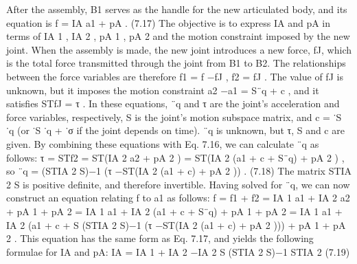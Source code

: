 After the assembly, B1 serves as the handle for the new articulated body, and its equation is f = IA a1 + pA . (7.17) The objective is to express IA and pA in terms of IA 1 , IA 2 , pA 1 , pA 2 and the motion constraint imposed by the new joint. When the assembly is made, the new joint introduces a new force, fJ, which is the total force transmitted through the joint from B1 to B2. The relationships between the force variables are therefore f1 = f −fJ , f2 = fJ . The value of fJ is unknown, but it imposes the motion constraint a2 −a1 = S¨q + c , and it satisfies STfJ = τ . In these equations, ¨q and τ are the joint’s acceleration and force variables, respectively, S is the joint’s motion subspace matrix, and c = ˙S ˙q (or ˙S ˙q + ˙σ if the joint depends on time). ¨q is unknown, but τ, S and c are given. By combining these equations with Eq. 7.16, we can calculate ¨q as follows: τ = STf2 = ST(IA 2 a2 + pA 2 ) = ST(IA 2 (a1 + c + S¨q) + pA 2 ) , so ¨q = (STIA 2 S)−1 (τ −ST(IA 2 (a1 + c) + pA 2 )) . (7.18) The matrix STIA 2 S is positive definite, and therefore invertible. Having solved for ¨q, we can now construct an equation relating f to a1 as follows: f = f1 + f2 = IA 1 a1 + IA 2 a2 + pA 1 + pA 2 = IA 1 a1 + IA 2 (a1 + c + S¨q) + pA 1 + pA 2 = IA 1 a1 + IA 2 (a1 + c + S (STIA 2 S)−1 (τ −ST(IA 2 (a1 + c) + pA 2 ))) + pA 1 + pA 2 . This equation has the same form as Eq. 7.17, and yields the following formulae for IA and pA: IA = IA 1 + IA 2 −IA 2 S (STIA 2 S)−1 STIA 2 (7.19)

